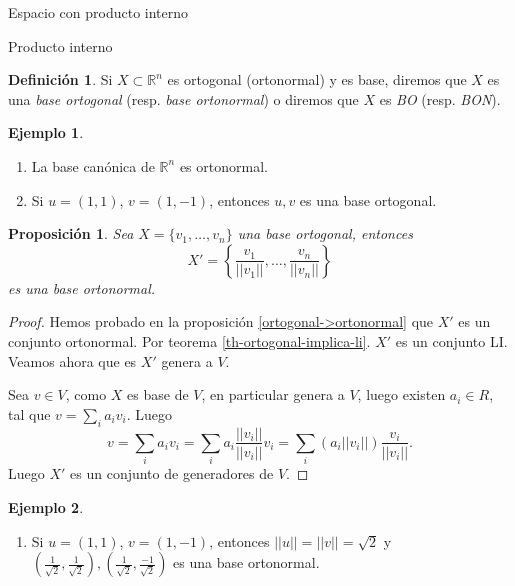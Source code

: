 \documentclass[a4paper,12pt,twoside,spanish,reqno]{amsbook}
\newtheorem{proposicion}[teorema]{Proposici\'on}
\theoremstyle{definition}
\newtheorem{definicion}{Definici\'on}[section]
\newtheorem{ejemplo}{Ejemplo}[section]
\theoremstyle{remark}
\newcommand{\R}{\mathbb R}
\begin{document}
\begin{chapter}{Espacio con producto interno}
\begin{section}{Producto interno}
        \begin{definicion} Si $X \subset \R^n$ es ortogonal (ortonormal) y es base, diremos que $X$ es una \emph{base ortogonal} (resp. \emph{base ortonormal}) o diremos que $X$ es \textit{BO} (resp. \textit{BON}).
        \end{definicion}
        
        \begin{ejemplo} ${}^{}$
            \begin{enumerate}
                \item La base canónica de $\R^n$ es ortonormal. 
                \item Si $u=(1,1)$, $v=(1,-1)$, entonces $u,v$ es una base ortogonal.  
            \end{enumerate}
        \end{ejemplo}
        
        \begin{proposicion} Sea $ X = \{v_1,\ldots,v_n\}$ una base ortogonal, entonces 
            \begin{equation*}
                X' = \left\{\frac{v_1}{||v_1||},\ldots,\frac{v_n}{||v_n||} \right\}
            \end{equation*}
            es una base ortonormal.
        \end{proposicion}
        \begin{proof}
            Hemos probado en la proposición \ref{ortogonal->ortonormal} que $X'$ es un conjunto ortonormal.  Por  teorema \ref{th-ortogonal-implica-li}. $X'$ es un conjunto LI.   Veamos ahora que es $X'$ genera a $V$. 
            
            Sea $v \in V$, como $X$  es base de  $V$, en particular genera a $V$, luego existen $a_i \in R$, tal que  $v = \sum_i a_i v_i$. Luego
            $$
            v = \sum_i a_i v_i = \sum_i a_i \frac{||v_i||}{||v_i||} v_i = \sum_i (a_i ||v_i||) \frac{v_i}{||v_i||}.
            $$
            Luego $X'$ es un conjunto de generadores de $V$. 
        \end{proof}
        \begin{ejemplo} 
            \begin{enumerate}
                \item Si $u=(1,1)$, $v=(1,-1)$, entonces $||u||=||v|| = \sqrt{2}$ y $(\frac{1}{\sqrt{2}},\frac{1}{\sqrt{2}}),(\frac{1}{\sqrt{2}},\frac{-1}{\sqrt{2}})$ es una base ortonormal.  
            \end{enumerate}
        \end{ejemplo}
        

\end{section}
\end{chapter}
\end{document}
